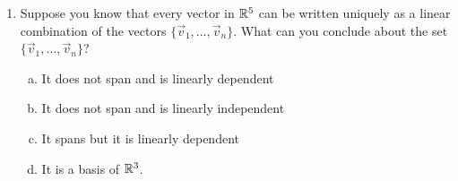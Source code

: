 \documentclass{article}
\begin{document}
\begin{enumerate}[1)]
\item Suppose you know that every vector in $\mathbb{R}^5$ can be written uniquely as a linear combination of the vectors $\{\vec{v}_1, \ldots, \vec{v}_n\}$.  What can you conclude about the set $\{\vec{v}_1, \ldots, \vec{v}_n\}$?
\begin{enumerate}[(a)]
\item It does not span and is linearly dependent
\item It does not span and is linearly independent
\item It spans but it is linearly dependent
\item It is a basis of $\mathbb{R}^3$.
\end{enumerate}

\end{enumerate}

\newpage
\end{document}

